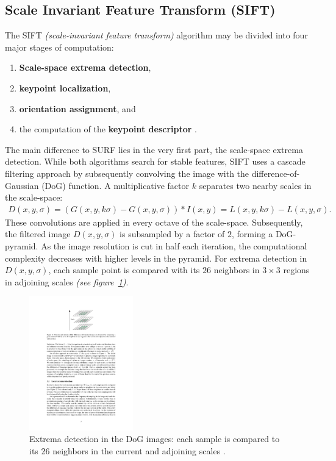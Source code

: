 \documentclass[a4paper, 11pt]{article} %
\begin{document}
\subsection{Scale Invariant Feature Transform (SIFT)}
The SIFT \textit{(scale-invariant feature transform)} algorithm may be divided into four major stages of computation:
\begin{enumerate}
	\item \textbf{Scale-space extrema detection},
	\item \textbf{keypoint localization},
	\item \textbf{orientation assignment}, and 
	\item the computation of the \textbf{keypoint descriptor} \cite{lowe2004distinctive}. 
\end{enumerate}
The main difference to SURF lies in the very first part, the scale-space extrema detection. While both algorithms search for stable features, SIFT uses a cascade filtering approach by subsequently convolving the image with the difference-of-Gaussian (DoG) function. A multiplicative factor $k$ separates two nearby scales in the scale-space: 
\begin{align}
D(x,y,\sigma) = (G(x,y,k \sigma) - G(x,y,\sigma)) * I(x,y) = L(x,y,k \sigma) - L(x,y,\sigma).
\end{align}
These convolutions are applied in every octave of the scale-space. Subsequently, the filtered image $D(x,y,\sigma)$ is subsampled by a factor of $2$, forming a DoG-pyramid. As the image resolution is cut in half each iteration, the computational complexity decreases with higher levels in the pyramid. For extrema detection in $D(x,y,\sigma)$, each sample point is compared with its $26$ neighbors in $3\times3$ regions in adjoining scales \textit{(see figure~\ref{fig:neighbors})}. 
\begin{figure}
	\centering
	\includegraphics[width=0.4\textwidth]{images/neighbors}
	\caption{Extrema detection in the DoG images: each sample is compared to its 26 neighbors in the current and adjoining scales \cite{lowe2004distinctive}.}
	\label{fig:neighbors}
\end{figure}
\end{document}
